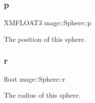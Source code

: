\subsubsection{\texorpdfstring{p}{p}}
{\footnotesize\ttfamily X\+M\+F\+L\+O\+A\+T3 mage\+::\+Sphere\+::p}

The position of this sphere. \hypertarget{structmage_1_1_sphere_af9121b33471e72b3df2fb032f5f68151}{}\label{structmage_1_1_sphere_af9121b33471e72b3df2fb032f5f68151} 
\subsubsection{\texorpdfstring{r}{r}}
{\footnotesize\ttfamily float mage\+::\+Sphere\+::r}

The radius of this sphere. 